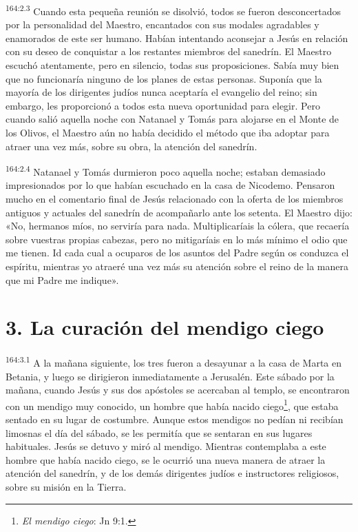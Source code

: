 \par 
\textsuperscript{164:2.3} Cuando esta pequeña reunión se disolvió, todos se fueron desconcertados por la personalidad del Maestro, encantados con sus modales agradables y enamorados de este ser humano. Habían intentando aconsejar a Jesús en relación con su deseo de conquistar a los restantes miembros del sanedrín. El Maestro escuchó atentamente, pero en silencio, todas sus proposiciones. Sabía muy bien que no funcionaría ninguno de los planes de estas personas. Suponía que la mayoría de los dirigentes judíos nunca aceptaría el evangelio del reino; sin embargo, les proporcionó a todos esta nueva oportunidad para elegir. Pero cuando salió aquella noche con Natanael y Tomás para alojarse en el Monte de los Olivos, el Maestro aún no había decidido el método que iba adoptar para atraer una vez más, sobre su obra, la atención del sanedrín.

\par 
\textsuperscript{164:2.4} Natanael y Tomás durmieron poco aquella noche; estaban demasiado impresionados por lo que habían escuchado en la casa de Nicodemo. Pensaron mucho en el comentario final de Jesús relacionado con la oferta de los miembros antiguos y actuales del sanedrín de acompañarlo ante los setenta. El Maestro dijo: «No, hermanos míos, no serviría para nada. Multiplicaríais la cólera, que recaería sobre vuestras propias cabezas, pero no mitigaríais en lo más mínimo el odio que me tienen. Id cada cual a ocuparos de los asuntos del Padre según os conduzca el espíritu, mientras yo atraeré una vez más su atención sobre el reino de la manera que mi Padre me indique».

\section*{3. La curación del mendigo ciego}
\par 
\textsuperscript{164:3.1} A la mañana siguiente, los tres fueron a desayunar a la casa de Marta en Betania, y luego se dirigieron inmediatamente a Jerusalén. Este sábado por la mañana, cuando Jesús y sus dos apóstoles se acercaban al templo, se encontraron con un mendigo muy conocido, un hombre que había nacido ciego\footnote{\textit{El mendigo ciego}: Jn 9:1.}, que estaba sentado en su lugar de costumbre. Aunque estos mendigos no pedían ni recibían limosnas el día del sábado, se les permitía que se sentaran en sus lugares habituales. Jesús se detuvo y miró al mendigo. Mientras contemplaba a este hombre que había nacido ciego, se le ocurrió una nueva manera de atraer la atención del sanedrín, y de los demás dirigentes judíos e instructores religiosos, sobre su misión en la Tierra.

